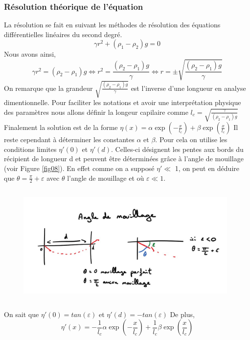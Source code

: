 \documentclass[10pt,a4paper]{article}
\begin{document}
\subsubsection{Résolution théorique de l'équation}
La résolution se fait en suivant les méthodes de résolution des équations différentielles linéaires du second degré.
\begin{equation}
\gamma r^{2} + (\rho_{1} - \rho_{2})g = 0
\end{equation}
Nous avons ainsi,
\begin{equation}
 \gamma r^{2}= (\rho_{2} - \rho_{1})g \iff  r^{2}=\frac{ (\rho_{2} - \rho_{1})g}{\gamma}
 \iff r = \pm \sqrt{\frac{ (\rho_{2} - \rho_{1})g}{\gamma}}
\end{equation}
On remarque que la grandeur $\sqrt{\frac{ (\rho_{2} - \rho_{1})g}{\gamma}}$ est l'inverse d'une longueur en analyse dimentionnelle. Pour faciliter les notations et avoir une interprétation physique des paramètres nous allons définir la longeur capilaire comme $l_{c} = \sqrt{\frac{\gamma }{(\rho_{2} - \rho_{1})g}}$
\newline\newline
Finalement  la solution est de la forme $\eta(x) = \alpha\exp({-\frac{ x}{l_{c}}}) + \beta\exp({\frac{ x}{l_{c}}})$
\newline
\newline
Il reste cependant à déterminer les constantes $\alpha$ et $\beta$. Pour cela on utilise les conditions limites $\eta\prime(0)$ et $\eta\prime(d)$.
Celles-ci désignent les pentes aux bords du récipient de longueur d et peuvent être déterminées grâce à l'angle de mouillage (voir Figure \ref{fig08}).
En effet comme on a supposé $\eta\prime \ll$ 1,  on peut en déduire que $\theta = \frac{\pi}{2} + \varepsilon$ avec $\theta$ l'angle de mouillage et où $\varepsilon \ll 1$.
\newline\newline
\begin{figure}[h]
	\centering
   \includegraphics[width=11cm,height=6cm]{Schema1.JPG}
    
\end{figure}
\newline\newline
On sait que $\eta\prime(0) = tan(\varepsilon)$  et $\eta\prime(d) = - tan(\varepsilon)$
\newline
De plus, 
\begin{equation}
	\eta\prime(x) =  -\frac{ 1}{l_{c}}\alpha\exp({-\frac{ x}{l_{c}}}) + \frac{ 1}{l_{c}}\beta\exp(\frac{ x}{l_{c}})
\end{equation}
\newline
\end{document}
